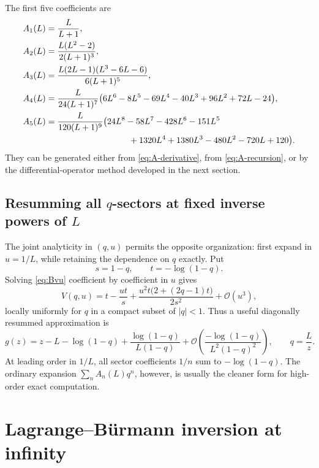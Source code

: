 \documentclass[11pt,a4paper]{article}
\numberwithin{equation}{section}
\theoremstyle{definition}
\theoremstyle{remark}
\newcommand{\Ord}{\mathcal O}
\newcommand{\Acoef}{A}
\begin{document}
The first five coefficients are
\begin{align}
 \Acoef_1(L)&=\frac{L}{L+1},
 \label{eq:A1-L}\\
 \Acoef_2(L)&=\frac{L(L^2-2)}{2(L+1)^3},
 \label{eq:A2-L}\\
 \Acoef_3(L)&=\frac{L(2L-1)(L^3-6L-6)}{6(L+1)^5},
 \label{eq:A3-L}\\
 \Acoef_4(L)&=\frac{L}{24(L+1)^7}
 \bigl(6L^6-8L^5-69L^4-40L^3
       +96L^2+72L-24\bigr),
 \label{eq:A4-L}\\
 \Acoef_5(L)&=\frac{L}{120(L+1)^9}
 \bigl(24L^8-58L^7-428L^6-151L^5
 \notag\\
 &\hspace{34mm}{}+1320L^4+1380L^3-480L^2-720L+120\bigr).
 \label{eq:A5-L}
\end{align}
They can be generated either from \eqref{eq:A-derivative}, from
\eqref{eq:A-recursion}, or by the differential-operator method developed
in the next section.

\subsection[Resumming all q-sectors at fixed inverse powers of L]{Resumming all \(q\)-sectors at fixed inverse powers of \(L\)}

The joint analyticity in \((q,u)\) permits the opposite organization: first
expand in \(u=1/L\), while retaining the dependence on \(q\) exactly.  Put
\begin{equation}\label{eq:s-t-def}
  s=1-q,
  \qquad t=-\log(1-q).
\end{equation}
Solving \eqref{eq:Bvu} coefficient by coefficient in \(u\) gives
\begin{equation}\label{eq:joint-resummation}
 V(q,u)=t-\frac{ut}{s}
 +\frac{u^2t\bigl(2+(2q-1)t\bigr)}{2s^2}
 +\Ord(u^3),
\end{equation}
locally uniformly for \(q\) in a compact subset of \(|q|<1\).  Thus a
useful diagonally resummed approximation is
\begin{equation}\label{eq:resummed-approx}
 g(z)=z-L-\log(1-q)
 +\frac{\log(1-q)}{L(1-q)}
 +\Ord\!\left(\frac{-\log(1-q)}{L^2(1-q)^2}\right),
 \qquad q=\frac{L}{z}.
\end{equation}
At leading order in \(1/L\), all sector coefficients \(1/n\) sum to
\(-\log(1-q)\).  The ordinary expansion
\(\sum_n\Acoef_n(L)q^n\), however, is usually the cleaner form for
high-order exact computation.

\section{Lagrange--B\"urmann inversion at infinity}
\end{document}
